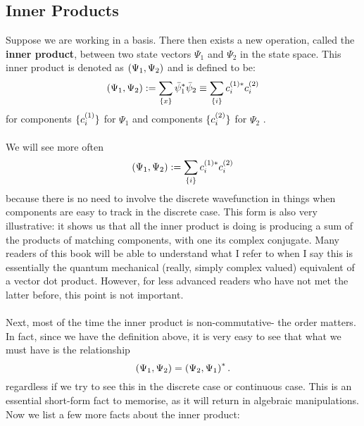 \subsection{Inner Products}
Suppose we are working in a basis. There then exists a new operation, called the \textbf{inner product},
between two state vectors $\Psi_{1}$ and $\Psi_{2}$ in the state space. This inner product is denoted as $\left(\Psi_{1},\Psi_{2}\right)$ and is defined to be:
$$
\left(\Psi_{1},\Psi_{2}\right):=\sum_{\{x\}}\bar{\psi}_{1}^{\ast}\bar{\psi}_{2}\equiv\sum_{\{i\}}c^{(1)\ast}_{i}c^{(2)}_{i}
$$
for components $\{c^{(1)}_{i}\}$ for $\Psi_{1}$ and components $\{c^{(2)}_{i}\}$ for $\Psi_{2}$ .
\\\\
We will see more often 
$$
\left(\Psi_{1},\Psi_{2}\right):=\sum_{\{i\}}c^{(1)\ast}_{i}c^{(2)}_{i}
$$
because there is no need to involve the discrete wavefunction in things when components are easy to track in the discrete case. This form is also very illustrative: it shows us that all the inner product is doing is producing a sum of the products of matching components, with one its complex conjugate. Many readers of this book will be able to understand what I refer to when I say this is essentially the quantum mechanical (really, simply complex valued) equivalent of a vector dot product. However, for less advanced readers who have not met the latter before, this point is not important.
\\\\
Next, most of the time the inner product is non-commutative- the order matters. In fact, since we have the definition above, it is very easy to see that what we must have is the relationship
$$
\left(\Psi_{1},\Psi_{2}\right)=\left(\Psi_{2},\Psi_{1}\right)^{\ast}.
$$
regardless if we try to see this in the discrete case or continuous case. This is an essential short-form fact to memorise, as it will return in algebraic manipulations. Now we list a few more facts about the inner product:
